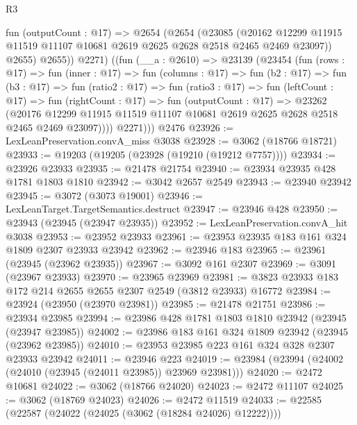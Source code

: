 \begin{lexlean}{R3}
\begin{coremodule}
          fun (outputCount : @17) =>
          @2654
            (@2654
              (@23085
                (@20162
                  @12299
                  @11915
                  @11519
                  @11107
                  @10681
                  @2619
                  @2625
                  @2628
                  @2518
                  @2465
                  @2469
                  @23097))
              @2655)
            @2655))
          @2271)
        ((fun (__a : @2610) =>
        @23139
          (@23454
            (fun (rows : @17) =>
            fun (inner : @17) =>
            fun (columns : @17) =>
            fun (b2 : @17) =>
            fun (b3 : @17) =>
            fun (ratio2 : @17) =>
            fun (ratio3 : @17) =>
            fun (leftCount : @17) =>
            fun (rightCount : @17) =>
            fun (outputCount : @17) =>
            @23262
              (@20176
                @12299
                @11915
                @11519
                @11107
                @10681
                @2619
                @2625
                @2628
                @2518
                @2465
                @2469
                @23097))))
          @2271)))
    @2476
@23926 := LexLeanPreservation.convA_miss @3038
@23928 := @3062 (@18766 @18721)
@23933 := @19203 (@19205 (@23928 (@19210 (@19212 @7757))))
@23934 := @23926 @23933
@23935 := @21478 @21754
@23940 := @23934 @23935 @428 @1781 @1803 @1810
@23942 := @3042 @2657 @2549
@23943 := @23940 @23942
@23945 := @3072 (@3073 @19001)
@23946 := LexLeanTarget.TargetSemantics.destruct
@23947 := @23946 @428
@23950 := @23943 (@23945 (@23947 @23935))
@23952 := LexLeanPreservation.convA_hit @3038
@23953 := @23952 @23933
@23961 := @23953 @23935 @183 @161 @324 @1809 @2307 @23933 @23942
@23962 := @23946 @183
@23965 := @23961 (@23945 (@23962 @23935))
@23967 := @3092 @161 @2307
@23969 := @3091 (@23967 @23933)
@23970 := @23965 @23969
@23981 := @3823 @23933 @183 @172 @214 @2655 @2655 @2307 @2549 (@3812 @23933) @16772
@23984 := @23924 (@23950 (@23970 @23981))
@23985 := @21478 @21751
@23986 := @23934 @23985
@23994 := @23986 @428 @1781 @1803 @1810 @23942 (@23945 (@23947 @23985))
@24002 := @23986 @183 @161 @324 @1809 @23942 (@23945 (@23962 @23985))
@24010 := @23953 @23985 @223 @161 @324 @328 @2307 @23933 @23942
@24011 := @23946 @223
@24019 := @23984 (@23994 (@24002 (@24010 (@23945 (@24011 @23985)) @23969 @23981)))
@24020 := @2472 @10681
@24022 := @3062 (@18766 @24020)
@24023 := @2472 @11107
@24025 := @3062 (@18769 @24023)
@24026 := @2472 @11519
@24033 := @22585 (@22587 (@24022 (@24025 (@3062 (@18284 @24026) @12222))))

\end{coremodule}
\end{lexlean}

